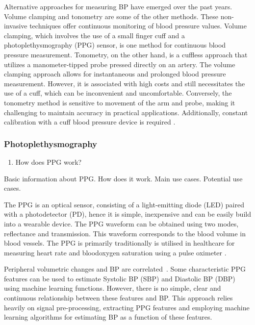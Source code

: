 \documentclass[12pt, bibliography=totoc]{scrartcl}
\begin{document}
Alternative approaches for measuring BP have emerged over the past years.
Volume clamping \cite{kimBallistocardiogramBasedApproachCuffless2018} and tonometry \cite{imholzFifteenYearsExperience1998} are some of the other methods. These non-invasive techniques offer continuous monitoring of blood pressure values. 
Volume clamping, which involves the use of a small finger cuff and a photoplethysmography (PPG) sensor, is one method for continuous blood pressure measurement. Tonometry, on the other hand, is a cuffless approach that utilizes a manometer-tipped probe pressed directly on an artery.
The volume clamping approach allows for instantaneous and prolonged blood pressure measurement. However, it is associated with high costs and still necessitates the use of a cuff, which can be inconvenient and uncomfortable. Conversely, the tonometry method is sensitive to movement of the arm and probe, making it challenging to maintain accuracy in practical applications. Additionally, constant calibration with a cuff blood pressure device is required \cite{peterReviewMethodsNoninvasive2014}.

\subsubsection{Photoplethysmography}
\label{ppg}

\begin{enumerate}
\item How does PPG work?
\end{enumerate}

Basic information about PPG. How does it work. Main use cases. Potential use cases.

The PPG is an optical sensor, consisting of a light-emitting diode (LED) paired with a photodetector (PD), hence it is simple, inexpensive and can be easily build into a wearable device. The PPG waveform can be obtained using two modes, reflectance and transmission. This waveform corresponds to the blood volume in blood vessels. The PPG is primarily traditionally is utilised in healthcare for measuring heart rate and bloodoxygen saturation using a pulse oximeter \cite{allenPhotoplethysmographyItsApplication2007}.

Peripheral volumetric changes and BP are correlated~\cite{langewoutersPressurediameterRelationshipsSegments1986}.
Some characteristic PPG features can be used to estimate Systolic BP (SBP) and Diastolic BP (DBP) using machine learning functions. However, there is no simple, clear and continuous relationship between these features and BP. This approach relies heavily on signal pre-processing, extracting PPG features and employing machine learning algorithms for estimating BP as a function of these features.
\end{document}
